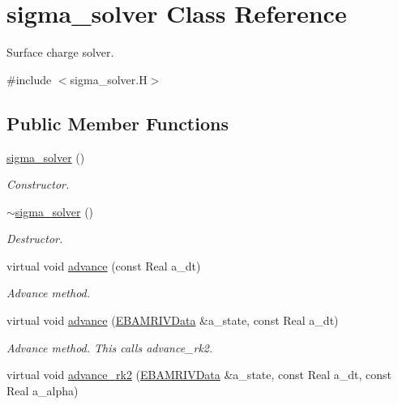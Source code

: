 \hypertarget{classsigma__solver}{}\section{sigma\+\_\+solver Class Reference}
\label{classsigma__solver}


Surface charge solver.  




{\ttfamily \#include $<$sigma\+\_\+solver.\+H$>$}

\subsection*{Public Member Functions}
\begin{DoxyCompactItemize}
\item 
\hyperlink{classsigma__solver_a1ddbb9955b035908ce3101b91b4c18f3}{sigma\+\_\+solver} ()
\begin{DoxyCompactList}\small\item\em Constructor. \end{DoxyCompactList}\item 
\hyperlink{classsigma__solver_aa57010aad7038733e686715eb776b9a7}{$\sim$sigma\+\_\+solver} ()
\begin{DoxyCompactList}\small\item\em Destructor. \end{DoxyCompactList}\item 
virtual void \hyperlink{classsigma__solver_a78e66bcc99b46dbcf0f40ffd39af30cf}{advance} (const Real a\+\_\+dt)
\begin{DoxyCompactList}\small\item\em Advance method. \end{DoxyCompactList}\item 
virtual void \hyperlink{classsigma__solver_a1318b9c1f014219d02ba19558d77c908}{advance} (\hyperlink{type__definitions_8H_a6b8fa905d55cbb491b52180386f0e0c1}{E\+B\+A\+M\+R\+I\+V\+Data} \&a\+\_\+state, const Real a\+\_\+dt)
\begin{DoxyCompactList}\small\item\em Advance method. This calls advance\+\_\+rk2. \end{DoxyCompactList}\item 
virtual void \hyperlink{classsigma__solver_a024f36ea58c428fdf5ae0433b3228ec8}{advance\+\_\+rk2} (\hyperlink{type__definitions_8H_a6b8fa905d55cbb491b52180386f0e0c1}{E\+B\+A\+M\+R\+I\+V\+Data} \&a\+\_\+state, const Real a\+\_\+dt, const Real a\+\_\+alpha)

\end{DoxyCompactItemize}
